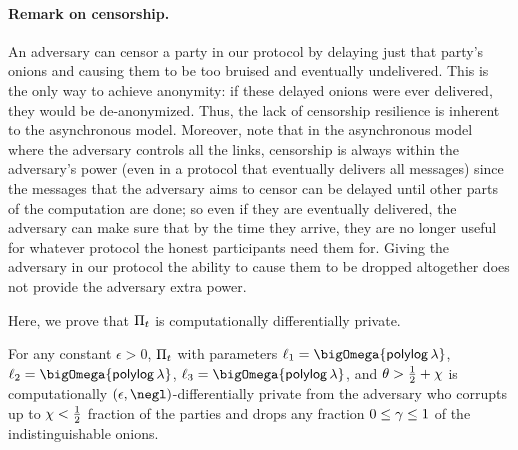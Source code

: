 \documentclass[runningheads,a4paper]{llncs}
\begin{document}
\paragraph{Remark on censorship.}
An adversary can censor a party in our protocol by delaying just that party's onions and causing them to be too bruised and eventually undelivered.  This is the only way to achieve anonymity: if these delayed onions were ever delivered, they would be de-anonymized.  Thus, the lack of censorship resilience is inherent to the asynchronous model.
Moreover, note that in the asynchronous model where the adversary controls all the links, censorship is always within the adversary’s power (even in a protocol that eventually delivers all messages) since the messages that the adversary aims to censor can be delayed until other parts of the computation are done; so even if they are eventually delivered, the adversary can make sure that by the time they arrive, they are no longer useful for whatever protocol the honest participants need them for. %
Giving the adversary in our protocol the ability to cause them to be dropped altogether does not provide the adversary extra power. 


Here, we prove that $\Pi_t$ is computationally differentially private. 

\begin{theorem}
\label{thm:mixing} 
For any constant $\epsilon > 0$, 
$\Pi_t$ with parameters
$\ell_1 = \bigOmega{\polylog \thinspace\secpar}$, $\ell_2 = \bigOmega{\polylog \thinspace\secpar}$, 
$\ell_3 = \bigOmega{\polylog\thinspace\secpar}$, and 
$\theta > \frac{1}{2} + \chi$ is computationally $(\epsilon, \negl)$-differentially private from the adversary who corrupts up to $\chi < \frac{1}{2}$ fraction of the parties and drops any fraction $0\le\gamma\le1$ of the indistinguishable onions.%
\end{theorem}
\end{document}
